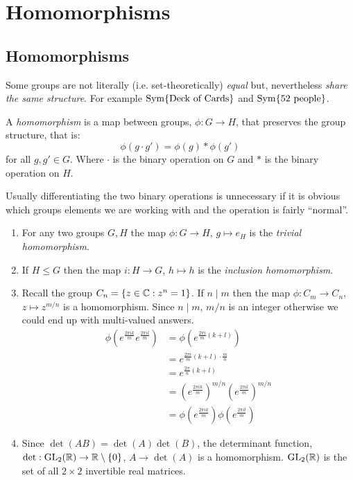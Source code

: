 \documentclass[../main.tex]{subfiles}
\begin{document}
\chapter{Homomorphisms}
\section{Homomorphisms}
Some groups are not literally (i.e. set-theoretically) \textit{equal} but, nevertheless \textit{share the same structure}.
For example $\operatorname{Sym}\{\text{Deck of Cards}\}$ and $\operatorname{Sym}\{\text{52 people}\}$.
\begin{definition}[Homomorphims]
  A \textit{homomorphism} is a map between groups, $\phi: G \to H$, that preserves the group structure, that is:
  \[
    \phi(g \cdot g') = \phi(g) * \phi(g')
  \]
  for all $g, g' \in G$. Where $\cdot$ is the binary operation on $G$ and $*$ is the binary operation on $H$.
\end{definition}
\begin{remark}[Notation]
  Usually differentiating the two binary operations is unnecessary if it is obvious which groups elements we are working with and the operation is fairly ``normal''.
\end{remark}
\begin{example}
  \begin{enumerate}
    \item For any two groups $G, H$ the map $\phi: G \to H$, $g \mapsto e_H$ is the \textit{trivial homomorphism}.
    \item If $H \leq G$ then the map $i: H \to G$, $h \mapsto h$ is the \textit{inclusion homomorphism}.
    \item Recall the group $C_n = \{z \in \mathbb{C} : z^{n} = 1\}$.
          If $n \mid m$ then the map $\phi: C_m \to C_n$, $z \mapsto z^{m/n}$ is a homomorphism.
          Since $n \mid m$, $m/n$ is an integer otherwise we could end up with multi-valued answers.
          \begin{align*}
            \phi\left(e^{\frac{2\pi i k}{m}} e^{\frac{2 \pi i l}{m}}\right) &= \phi\left(e^{\frac{2\pi i}{m}(k + l)}\right) \\
                                                                            &= e^{\frac{2\pi i}{m}(k + l)\cdot \frac{m}{n}} \\
                                                                            &= e^{\frac{2\pi}{n}(k + l)} \\
                                                                            &= \left(e^{\frac{2 \pi i k}{m}}\right)^{m/n} \left(e^{\frac{2 \pi i l}{m}}\right)^{m/n} \\
                                                                            &= \phi\left(e^{\frac{2\pi i k}{m}}\right) \phi\left(e^{\frac{2\pi i l}{m}}\right)
          \end{align*}
    \item Since $\det(AB) = \det(A)\det(B)$, the determinant function, $\det: \mathrm{GL}_2(\mathbb{R}) \to \mathbb{R} \setminus \{0\}$, $A \to \det(A)$ is a homomorphism.
          $\mathrm{GL}_2(\mathbb{R})$ is the set of all $2\times2$ invertible real matrices.
  \end{enumerate}
\end{example}
\end{document}
